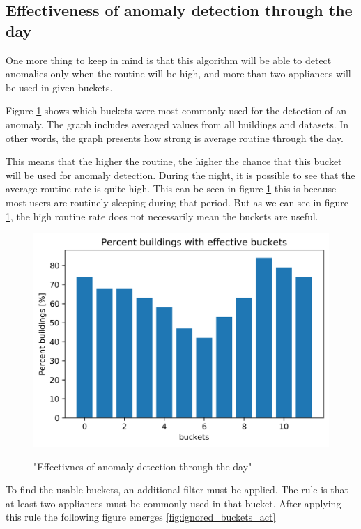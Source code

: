 \subsection{Effectiveness of anomaly detection through the day}

One more thing to keep in mind is that this algorithm will be able to detect anomalies only when
the routine will be high, and more than two appliances will be used in given buckets.

Figure \ref{fig:ignored_buckets_22} shows which buckets were most commonly used for the detection of an anomaly.
The graph includes averaged values from all buildings and datasets. 
In other words, the graph presents how strong is average routine through the day.

This means that the higher the routine, the higher the chance that this bucket will be used for anomaly detection.
During the night, it is possible to see that the average routine rate is quite high.
This can be seen in figure \ref{fig:ignored_buckets_22}
this is because most users are routinely sleeping during that period.
But as we can see in figure \ref{fig:ignored_buckets_22},
the high routine rate does not necessarily mean the buckets are useful.

\begin{figure}[H]
	\centering
	\caption{"Effectivnes of anomaly detection through the day"}
	\includegraphics[width=.8\textwidth]{Figures/EC/ignored_buckets_dist.png}
	\label{fig:ignored_buckets_22}
\end{figure}

To find the usable buckets, an additional filter must be applied.
The rule is that at least two appliances must be commonly used in that bucket. 
After applying this rule the following figure emerges \ref{fig:ignored_buckets_act}

